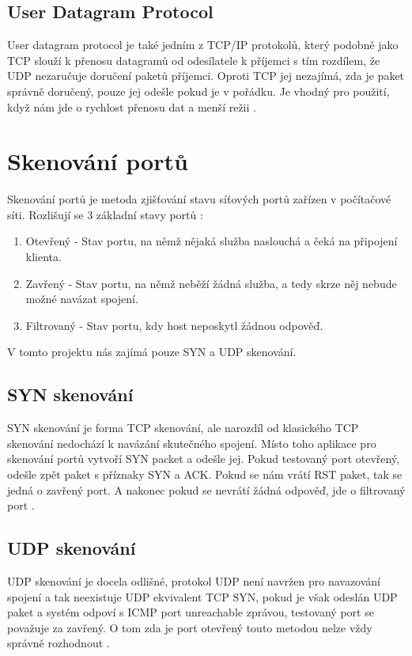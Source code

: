 \documentclass[a4paper, 11pt]{article}
\begin{document}
\subsection{User Datagram Protocol}
User datagram protocol je také jedním z TCP/IP protokolů, který podobně jako TCP slouží k přenosu datagramů od odesílatele k příjemci s tím rozdílem, že UDP nezaručuje doručení paketů příjemci. Oproti TCP jej nezajímá, zda je paket správně doručený, pouze jej odešle pokud je v pořádku. Je vhodný pro použití, když nám jde o rychlost přenosu dat a menší režii \cite{udprotocol}. 

\section{Skenování portů}
Skenování portů je metoda zjišťování stavu síťových portů zařízen v počítačové síti. Rozlišují se 3 základní stavy portů \cite{portscan}:
	\begin{enumerate}
		\item Otevřený - Stav portu, na němž nějaká služba naslouchá a čeká na připojení klienta.
		\item Zavřený - Stav portu, na němž neběží žádná služba, a tedy skrze něj nebude možné navázat spojení.
		\item Filtrovaný - Stav portu, kdy host neposkytl žádnou odpověď.
	\end{enumerate}
V tomto projektu nás zajímá pouze SYN a UDP skenování.
\subsection{SYN skenování}
SYN skenování je forma TCP skenování, ale narozdíl od klasického TCP skenování nedochází k navázání skutečného spojení. Místo toho aplikace pro skenování portů vytvoří SYN packet a odešle jej. Pokud testovaný port otevřený, odešle zpět paket s příznaky SYN a ACK. Pokud se nám vrátí RST paket, tak se jedná o zavřený port. A nakonec pokud se nevrátí žádná odpověď, jde o filtrovaný port \cite{portscan}. 
\subsection{UDP skenování}
UDP skenování je docela odlišné, protokol UDP není navržen pro navazování spojení a tak neexistuje UDP ekvivalent TCP SYN, pokud je však odeslán UDP paket a systém odpoví s ICMP port unreachable zprávou, testovaný port se považuje za zavřený. O tom zda je port otevřený touto metodou nelze vždy správně rozhodnout \cite{portscan}. 
\end{document}
